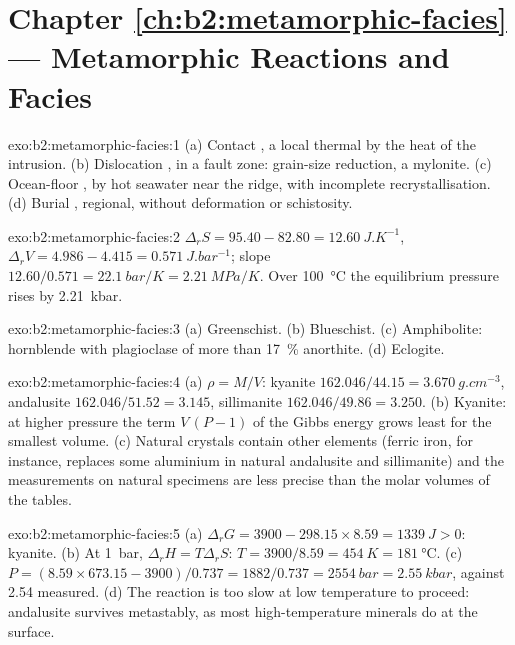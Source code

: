 \section*{Chapter \ref{ch:b2:metamorphic-facies} --- Metamorphic Reactions and Facies}

\begin{solution}{exo:b2:metamorphic-facies:1}
(a) Contact , a local thermal  by the heat of the intrusion.
(b) Dislocation , in a fault zone: grain-size reduction, a mylonite.
(c) Ocean-floor , by hot seawater near the ridge, with incomplete
recrystallisation. (d) Burial , regional, without deformation or
schistosity.
\end{solution}

\begin{solution}{exo:b2:metamorphic-facies:2}
$\Delta_r S = 95.40 - 82.80 = \qty{12.60}{J.K^{-1}}$, $\Delta_r V = 4.986 - 4.415 =
\qty{0.571}{J.bar^{-1}}$; slope $12.60/0.571 = \qty{22.1}{bar/K} = \qty{2.21}{MPa/K}$.
Over \qty{100}{\celsius} the equilibrium pressure rises by \qty{2.21}{kbar}.
\end{solution}

\begin{solution}{exo:b2:metamorphic-facies:3}
(a) Greenschist. (b) Blueschist. (c) Amphibolite: hornblende with plagioclase of more
than \qty{17}{\percent} anorthite. (d) Eclogite.
\end{solution}

\begin{solution}{exo:b2:metamorphic-facies:4}
(a) $\rho = M/V$: kyanite $162.046/44.15 = \qty{3.670}{g.cm^{-3}}$, andalusite
$162.046/51.52 = 3.145$, sillimanite $162.046/49.86 = 3.250$. (b) Kyanite: at higher
pressure the term $V\,(P - 1)$ of the Gibbs energy grows least for the smallest volume.
(c) Natural crystals contain other elements (ferric iron, for instance, replaces some
aluminium in natural andalusite and sillimanite) and the measurements on natural
specimens are less precise than the molar volumes of the tables.
\end{solution}

\begin{solution}{exo:b2:metamorphic-facies:5}
(a) $\Delta_r G = 3900 - 298.15\times8.59 = \qty{+1339}{J} > 0$: kyanite. (b) At
\qty{1}{bar}, $\Delta_r H = T\Delta_r S$: $T = 3900/8.59 = \qty{454}{K} =
\qty{181}{\celsius}$. (c) $P = (8.59\times673.15 - 3900)/0.737 = 1882/0.737 =
\qty{2554}{bar} = \qty{2.55}{kbar}$, against 2.54 measured. (d) The reaction is too slow
at low temperature to proceed: andalusite survives metastably, as most high-temperature
minerals do at the surface.
\end{solution}

